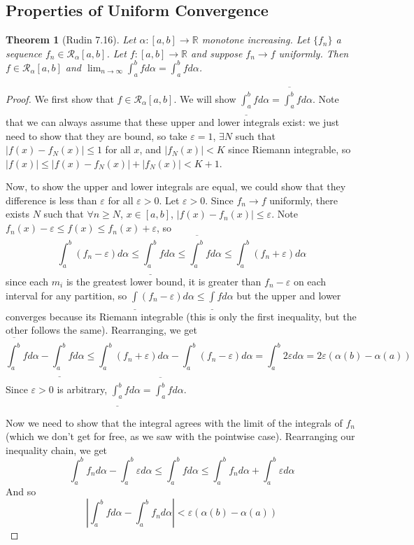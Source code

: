 \documentclass{article}
\theoremstyle{plain}
\newtheorem{theorem}{Theorem}
\theoremstyle{remark}
\newcommand{\R}{{\mathbb R}}
\newcommand{\ep}{{\varepsilon}}
\begin{document}
\subsection{Properties of Uniform Convergence}
\begin{theorem}[Rudin 7.16]
	Let $\alpha \colon [a,b] \to \R$ monotone increasing.
	Let $\{f_n\}$ a sequence $f_n \in \mathcal{R}_\alpha[a,b]$.
	Let $f \colon [a,b] \to \R$ and suppose $f_n \to f$ uniformly.
	Then $f \in \mathcal{R}_\alpha[a,b]$ and
	$\lim_{n\to\infty}\int_a^b fd\alpha = \int_a^bfd\alpha$.
\end{theorem}
\begin{proof}
	We first show that $f \in \mathcal{R}_\alpha[a,b]$.
	We will show $\underline{\int_a^b} fd\alpha = \overline{\int_a^b}fd\alpha$.
	Note that we can always assume that these upper and lower integrals exist:
	we just need to show that they are bound, so
	take $\ep = 1$, $\exists N$ such that $|f(x) - f_N(x)| \leq 1$ for all $x$,
	and $|f_N(x)| < K$ since Riemann integrable,
	so $|f(x)| \leq |f(x) - f_N(x)| + |f_N(x)| < K + 1$.

	Now, to show the upper and lower integrals are equal, we could show that
	they difference is less than $\ep$ for all $\ep > 0$.
	Let $\ep > 0$. Since $f_n \to f$ uniformly, there exists $N$ such that
	$\forall n \geq N$, $x \in [a,b]$, $|f(x) - f_n(x)| \leq \ep$.
	Note $f_n(x) - \ep \leq f(x) \leq f_n(x) + \ep$, so
	\[
		\int_a^b (f_n - \ep)d\alpha \leq \underline{\int_a^b} fd\alpha
		\leq \overline{\int_a^b}fd\alpha \leq \int_a^b(f_n + \ep)d\alpha
	\]
	since each $m_i$ is the greatest lower bound,
	it is greater than $f_n-\ep$ on each interval for any partition,
	so $\underline{\int}(f_n - \ep)d\alpha \leq \underline{\int}fd\alpha$
	but the upper and lower converges because its Riemann integrable
	(this is only the first inequality, but the other follows the same).
	Rearranging, we get
	\[
		\overline{\int_a^b}fd\alpha - \underline{\int_a^b} fd\alpha
		\leq \int_a^b(f_n+\ep)d\alpha - \int_a^b(f_n-\ep)d\alpha
		= \int_a^b 2\ep d\alpha = 2\ep(\alpha(b) - \alpha(a))
	\]
	Since $\ep > 0$ is arbitrary, $\underline{\int_a^b} fd\alpha = \overline{\int_a^b}fd\alpha$.

	Now we need to show that the integral agrees with the limit of the integrals of $f_n$
	(which we don't get for free, as we saw with the pointwise case).
	Rearranging our inequality chain, we get
	\[
		\int_a^b f_nd\alpha - \int_a^b \ep d\alpha
		\leq \int_a^b fd\alpha \leq \int_a^b f_nd\alpha + \int_a^b \ep d\alpha
	\]
	And so
	\[
		\left\lvert\int_a^b fd\alpha - \int_a^b f_nd\alpha\right\rvert < \ep(\alpha(b)-\alpha(a))
	\]
\end{proof}
\end{document}
